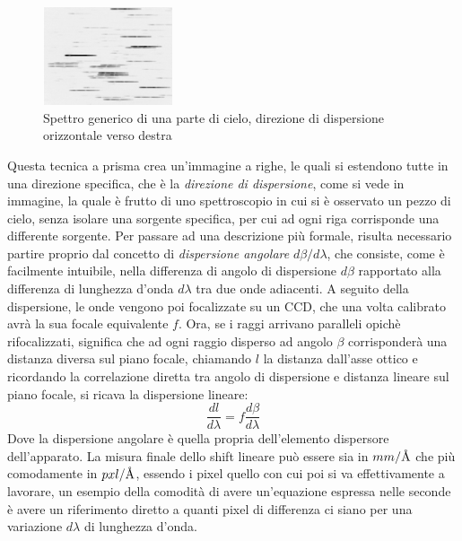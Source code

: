 \begin{figure}
    \centering
    \vspace{-5pt}
    \includegraphics[width=0.34\textwidth]{Immagini/Capitolo3/Spettro_cielo_generico.PNG}
    \caption*{Spettro generico di una parte di cielo, direzione di dispersione orizzontale verso destra}
    \vspace{-5pt}
\end{figure}

Questa tecnica a prisma crea un'immagine a righe, le quali si estendono tutte in una direzione specifica, che è la \textit{direzione di dispersione}, come si vede in immagine, la quale è frutto di uno spettroscopio in cui si è osservato un pezzo di cielo, senza isolare una sorgente specifica, per cui ad ogni riga corrisponde una differente sorgente. Per passare ad una descrizione più formale, risulta necessario partire proprio dal concetto di \textit{dispersione angolare} $d\beta/d\lambda$, che consiste, come è facilmente intuibile, nella differenza di angolo di dispersione $d\beta$ rapportato alla differenza di lunghezza d'onda $d\lambda$ tra due onde adiacenti. A seguito della dispersione, le onde vengono poi focalizzate su un CCD, che una volta calibrato avrà la sua focale equivalente $f$. Ora, se i raggi arrivano paralleli opichè rifocalizzati, significa che ad ogni raggio disperso ad angolo $\beta$ corrisponderà una distanza diversa sul piano focale, chiamando $l$ la distanza dall'asse ottico e ricordando la correlazione diretta tra angolo di dispersione e distanza lineare sul piano focale, si ricava la dispersione lineare:
\begin{equation}
    \frac{dl}{d\lambda} = f \frac{d\beta}{d\lambda}
\end{equation}
Dove la dispersione angolare è quella propria dell'elemento dispersore dell'apparato. La misura finale dello shift lineare può essere sia in $mm/\mbox{\normalfont\AA}$ che più comodamente in $pxl/\mbox{\normalfont\AA}$, essendo i pixel quello con cui poi si va effettivamente a lavorare, un esempio della comodità di avere un'equazione espressa nelle seconde è avere un riferimento diretto a quanti pixel di differenza ci siano per una variazione $d\lambda$ di lunghezza d'onda.

